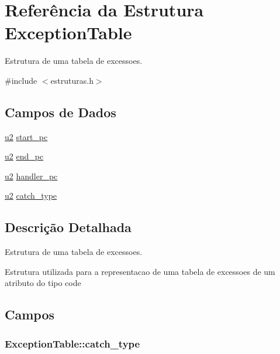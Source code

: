 \hypertarget{struct_exception_table}{}\section{Referência da Estrutura Exception\+Table}
\label{struct_exception_table}


Estrutura de uma tabela de excessoes.  




{\ttfamily \#include $<$estruturas.\+h$>$}

\subsection*{Campos de Dados}
\begin{DoxyCompactItemize}
\item 
\hyperlink{estruturas_8h_a5f223212eef04d10a4550ded680cb1cf}{u2} \hyperlink{struct_exception_table_af137b3a966825f91146039797d3b1ba5}{start\+\_\+pc}
\item 
\hyperlink{estruturas_8h_a5f223212eef04d10a4550ded680cb1cf}{u2} \hyperlink{struct_exception_table_ac2df73606ebe48af50a629f83fe9c677}{end\+\_\+pc}
\item 
\hyperlink{estruturas_8h_a5f223212eef04d10a4550ded680cb1cf}{u2} \hyperlink{struct_exception_table_a664ec4b395e02d3a5bfa6cef3493c1e7}{handler\+\_\+pc}
\item 
\hyperlink{estruturas_8h_a5f223212eef04d10a4550ded680cb1cf}{u2} \hyperlink{struct_exception_table_a440736a74baddb4197715e85ef73b836}{catch\+\_\+type}
\end{DoxyCompactItemize}


\subsection{Descrição Detalhada}
Estrutura de uma tabela de excessoes. 

Estrutura utilizada para a representacao de uma tabela de excessoes de um atributo do tipo code 

\subsection{Campos}
\subsubsection[{\texorpdfstring{catch\+\_\+type}{catch_type}}]{ Exception\+Table\+::catch\+\_\+type}\hypertarget{struct_exception_table_a440736a74baddb4197715e85ef73b836}{}\label{struct_exception_table_a440736a74baddb4197715e85ef73b836}
